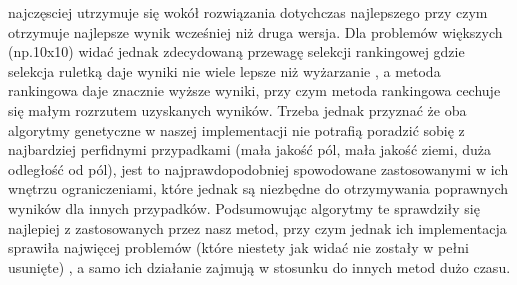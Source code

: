 \documentclass{article}
\begin{document}
najczęsciej utrzymuje się wokół rozwiązania dotychczas najlepszego przy czym otrzymuje najlepsze wynik wcześniej niż druga wersja. Dla problemów większych (np.10x10) widać jednak zdecydowaną przewagę selekcji rankingowej gdzie selekcja ruletką daje wyniki nie wiele lepsze niż wyżarzanie , a  metoda rankingowa daje znacznie wyższe wyniki, przy czym metoda rankingowa cechuje się małym rozrzutem uzyskanych wyników. Trzeba jednak przyznać że oba algorytmy genetyczne w naszej implementacji nie potrafią poradzić sobię z najbardziej perfidnymi przypadkami (mała jakość pól, mała jakość ziemi, duża odległość od pól), jest to najprawdopodobniej spowodowane zastosowanymi w ich wnętrzu ograniczeniami, które jednak są niezbędne do otrzymywania poprawnych wyników dla innych przypadków. Podsumowując algorytmy te sprawdziły się najlepiej z zastosowanych przez nasz metod, przy czym jednak ich implementacja sprawiła najwięcej problemów (które niestety jak widać nie zostały w pełni usunięte) , a samo ich działanie zajmują w stosunku do innych metod dużo czasu.
\end{document}
